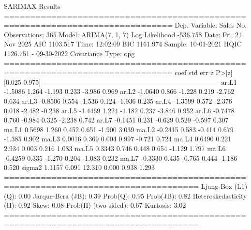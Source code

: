 \begin{console}
                               SARIMAX Results                                
==============================================================================
Dep. Variable:                  Sales   No. Observations:                  365
Model:                 ARIMA(7, 1, 7)   Log Likelihood                -536.758
Date:                Fri, 21 Nov 2025   AIC                           1103.517
Time:                        12:02:09   BIC                           1161.974
Sample:                    10-01-2021   HQIC                          1126.751
                         - 09-30-2022                                         
Covariance Type:                  opg                                         
==============================================================================
                 coef    std err          z      P>|z|      [0.025      0.975]
------------------------------------------------------------------------------
ar.L1         -1.5086      1.264     -1.193      0.233      -3.986       0.969
ar.L2         -1.0640      0.866     -1.228      0.219      -2.762       0.634
ar.L3         -0.8506      0.554     -1.536      0.124      -1.936       0.235
ar.L4         -1.3599      0.572     -2.376      0.018      -2.482      -0.238
ar.L5         -1.4469      1.224     -1.182      0.237      -3.846       0.952
ar.L6         -0.7478      0.760     -0.984      0.325      -2.238       0.742
ar.L7         -0.1451      0.231     -0.629      0.529      -0.597       0.307
ma.L1          0.5698      1.260      0.452      0.651      -1.900       3.039
ma.L2         -0.2415      0.583     -0.414      0.679      -1.385       0.902
ma.L3          0.0016      0.369      0.004      0.997      -0.721       0.724
ma.L4          0.6490      0.221      2.934      0.003       0.216       1.083
ma.L5          0.3343      0.746      0.448      0.654      -1.129       1.797
ma.L6         -0.4259      0.335     -1.270      0.204      -1.083       0.232
ma.L7         -0.3330      0.435     -0.765      0.444      -1.186       0.520
sigma2         1.1157      0.091     12.310      0.000       0.938       1.293
===================================================================================
Ljung-Box (L1) (Q):                   0.00   Jarque-Bera (JB):                 0.39
Prob(Q):                              0.95   Prob(JB):                         0.82
Heteroskedasticity (H):               0.92   Skew:                             0.08
Prob(H) (two-sided):                  0.67   Kurtosis:                         3.02
===================================================================================


\end{console}

